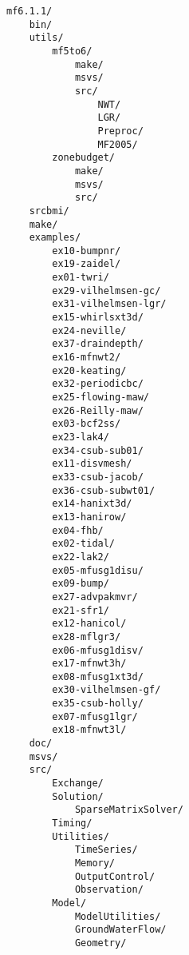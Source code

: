 \begin{verbatim}
mf6.1.1/ 
    bin/ 
    utils/ 
        mf5to6/ 
            make/ 
            msvs/ 
            src/ 
                NWT/ 
                LGR/ 
                Preproc/ 
                MF2005/ 
        zonebudget/ 
            make/ 
            msvs/ 
            src/ 
    srcbmi/ 
    make/ 
    examples/ 
        ex10-bumpnr/ 
        ex19-zaidel/ 
        ex01-twri/ 
        ex29-vilhelmsen-gc/ 
        ex31-vilhelmsen-lgr/ 
        ex15-whirlsxt3d/ 
        ex24-neville/ 
        ex37-draindepth/ 
        ex16-mfnwt2/ 
        ex20-keating/ 
        ex32-periodicbc/ 
        ex25-flowing-maw/ 
        ex26-Reilly-maw/ 
        ex03-bcf2ss/ 
        ex23-lak4/ 
        ex34-csub-sub01/ 
        ex11-disvmesh/ 
        ex33-csub-jacob/ 
        ex36-csub-subwt01/ 
        ex14-hanixt3d/ 
        ex13-hanirow/ 
        ex04-fhb/ 
        ex02-tidal/ 
        ex22-lak2/ 
        ex05-mfusg1disu/ 
        ex09-bump/ 
        ex27-advpakmvr/ 
        ex21-sfr1/ 
        ex12-hanicol/ 
        ex28-mflgr3/ 
        ex06-mfusg1disv/ 
        ex17-mfnwt3h/ 
        ex08-mfusg1xt3d/ 
        ex30-vilhelmsen-gf/ 
        ex35-csub-holly/ 
        ex07-mfusg1lgr/ 
        ex18-mfnwt3l/ 
    doc/ 
    msvs/ 
    src/ 
        Exchange/ 
        Solution/ 
            SparseMatrixSolver/ 
        Timing/ 
        Utilities/ 
            TimeSeries/ 
            Memory/ 
            OutputControl/ 
            Observation/ 
        Model/ 
            ModelUtilities/ 
            GroundWaterFlow/ 
            Geometry/ 
\end{verbatim}
